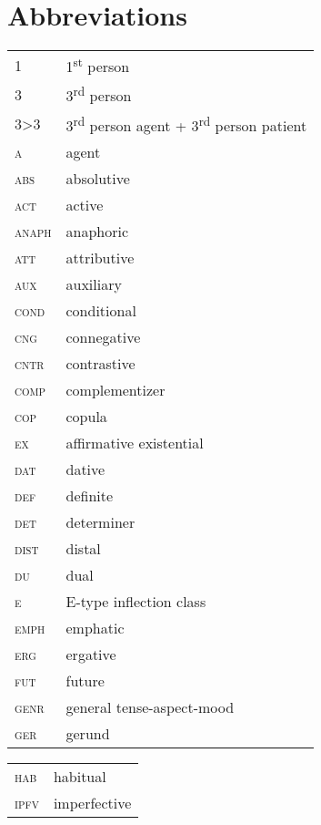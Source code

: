 ﻿\documentclass[output=paper]{langsci/langscibook}
\begin{document}
\section*{Abbreviations}
\begin{minipage}{\textwidth}
\begin{tabularx}{.5\textwidth}[t]{@{} l Q }
1				&1\textsuperscript{st} person\\
3 				&3\textsuperscript{rd} person\\
3>3				&3\textsuperscript{rd} person agent + 3\textsuperscript{rd}
person patient\\
\textsc{a}	&agent\\
\textsc{abs}		&absolutive\\
\textsc{act}		&active\\
\textsc{anaph}		&anaphoric\\
\textsc{att}	&attributive\\
\textsc{aux}		&auxiliary\\
\textsc{cond}		&conditional\\
\textsc{cng}		&connegative\\
\textsc{cntr}		&contrastive\\
\textsc{comp}       &complementizer\\
\textsc{cop}		&copula\\
\textsc{ex}		& affirmative existential\\
\textsc{dat} 	&dative\\
\textsc{def}		&definite\\
\textsc{det}	&determiner\\
\textsc{dist} 		&distal\\
\textsc{du}         &dual\\
\textsc{e}          &E-type inflection class\\
\textsc{emph}       &emphatic\\
\textsc{erg}        &ergative\\
\textsc{fut} 		&future\\
\textsc{genr}		&general tense-aspect-mood\\
\textsc{ger}		&gerund\\
\end{tabularx}
\begin{tabularx}{.5\textwidth}[t]{ l Q @{}}
\textsc{hab}		&habitual\\
\textsc{ipfv}		&imperfective\\

\end{tabularx}
\end{minipage}
\end{document}
